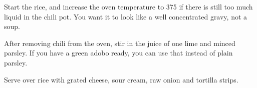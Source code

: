 \begin{recipe}
Start the rice, and increase the oven temperature to 375 if there is still too much liquid in the chili pot. You want it to look like a well concentrated gravy, not a soup.


After removing chili from the oven, stir in the juice of one lime and minced parsley. If you have a green adobo ready, you can use that instead of plain parsley.


Serve over rice with grated cheese, sour cream, raw onion and tortilla strips.

\end{recipe}
